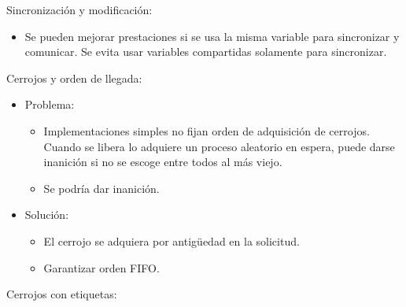 \documentclass[12pt, twoside, openright]{report} %
\begin{document}
    Sincronización y modificación:

    \begin{itemize}
    
    \item
      Se pueden mejorar prestaciones si se usa la misma variable para
      sincronizar y comunicar. Se evita usar variables compartidas
      solamente para sincronizar.
    \end{itemize}

    Cerrojos y orden de llegada:

    \begin{itemize}
    
    \item
      Problema:

      \begin{itemize}
      
      \item
        Implementaciones simples no fijan orden de adquisición de
        cerrojos. Cuando se libera lo adquiere un proceso aleatorio en
        espera, puede darse inanición si no se escoge entre todos al
        más viejo.
      \item
        Se podría dar inanición.
      \end{itemize}
    \item
      Solución:

      \begin{itemize}
      
      \item
        El cerrojo se adquiera por antigüedad en la solicitud.
      \item
        Garantizar orden FIFO.
      \end{itemize}
    \end{itemize}
\pagebreak
    Cerrojos con etiquetas:
\end{document}
